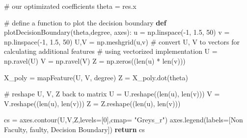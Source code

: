 \documentclass[
  letterpaper,
  DIV=11,
  numbers=noendperiod]{scrreprt}
\newenvironment{Shaded}{\begin{snugshade}}{\end{snugshade}}
\newcommand{\BuiltInTok}[1]{\textcolor[rgb]{0.00,0.23,0.31}{#1}}
\newcommand{\CommentTok}[1]{\textcolor[rgb]{0.37,0.37,0.37}{#1}}
\newcommand{\ControlFlowTok}[1]{\textcolor[rgb]{0.00,0.23,0.31}{\textbf{#1}}}
\newcommand{\DecValTok}[1]{\textcolor[rgb]{0.68,0.00,0.00}{#1}}
\newcommand{\FloatTok}[1]{\textcolor[rgb]{0.68,0.00,0.00}{#1}}
\newcommand{\KeywordTok}[1]{\textcolor[rgb]{0.00,0.23,0.31}{\textbf{#1}}}
\newcommand{\NormalTok}[1]{\textcolor[rgb]{0.00,0.23,0.31}{#1}}
\newcommand{\OperatorTok}[1]{\textcolor[rgb]{0.37,0.37,0.37}{#1}}
\newcommand{\StringTok}[1]{\textcolor[rgb]{0.13,0.47,0.30}{#1}}
\begin{document}
\begin{Shaded}
\begin{Highlighting}[]
\CommentTok{\# our optimizated coefficients}
\NormalTok{theta }\OperatorTok{=}\NormalTok{ res.x}
\end{Highlighting}
\end{Shaded}

\begin{Shaded}
\begin{Highlighting}[]
\CommentTok{\# define a function to plot the decision boundary}
\KeywordTok{def}\NormalTok{ plotDecisionBoundary(theta,degree, axes):}
\NormalTok{    u }\OperatorTok{=}\NormalTok{ np.linspace(}\OperatorTok{{-}}\DecValTok{1}\NormalTok{, }\FloatTok{1.5}\NormalTok{, }\DecValTok{50}\NormalTok{)}
\NormalTok{    v }\OperatorTok{=}\NormalTok{ np.linspace(}\OperatorTok{{-}}\DecValTok{1}\NormalTok{, }\FloatTok{1.5}\NormalTok{, }\DecValTok{50}\NormalTok{)}
\NormalTok{    U,V }\OperatorTok{=}\NormalTok{ np.meshgrid(u,v)}
    \CommentTok{\# convert U, V to vectors for calculating additional features}
    \CommentTok{\# using vectorized implementation}
\NormalTok{    U }\OperatorTok{=}\NormalTok{ np.ravel(U)}
\NormalTok{    V }\OperatorTok{=}\NormalTok{ np.ravel(V)}
\NormalTok{    Z }\OperatorTok{=}\NormalTok{ np.zeros((}\BuiltInTok{len}\NormalTok{(u) }\OperatorTok{*} \BuiltInTok{len}\NormalTok{(v)))}
    
\NormalTok{    X\_poly }\OperatorTok{=}\NormalTok{ mapFeature(U, V, degree)}
\NormalTok{    Z }\OperatorTok{=}\NormalTok{ X\_poly.dot(theta)}
    
    \CommentTok{\# reshape U, V, Z back to matrix}
\NormalTok{    U }\OperatorTok{=}\NormalTok{ U.reshape((}\BuiltInTok{len}\NormalTok{(u), }\BuiltInTok{len}\NormalTok{(v)))}
\NormalTok{    V }\OperatorTok{=}\NormalTok{ V.reshape((}\BuiltInTok{len}\NormalTok{(u), }\BuiltInTok{len}\NormalTok{(v)))}
\NormalTok{    Z }\OperatorTok{=}\NormalTok{ Z.reshape((}\BuiltInTok{len}\NormalTok{(u), }\BuiltInTok{len}\NormalTok{(v)))}
    
\NormalTok{    cs }\OperatorTok{=}\NormalTok{ axes.contour(U,V,Z,levels}\OperatorTok{=}\NormalTok{[}\DecValTok{0}\NormalTok{],cmap}\OperatorTok{=} \StringTok{"Greys\_r"}\NormalTok{)}
\NormalTok{    axes.legend(labels}\OperatorTok{=}\NormalTok{[}\StringTok{\textquotesingle{}Non Faculty\textquotesingle{}}\NormalTok{, }\StringTok{\textquotesingle{}faulty\textquotesingle{}}\NormalTok{, }\StringTok{\textquotesingle{}Decision Boundary\textquotesingle{}}\NormalTok{])}
    \ControlFlowTok{return}\NormalTok{ cs}
\end{Highlighting}
\end{Shaded}
\end{document}
